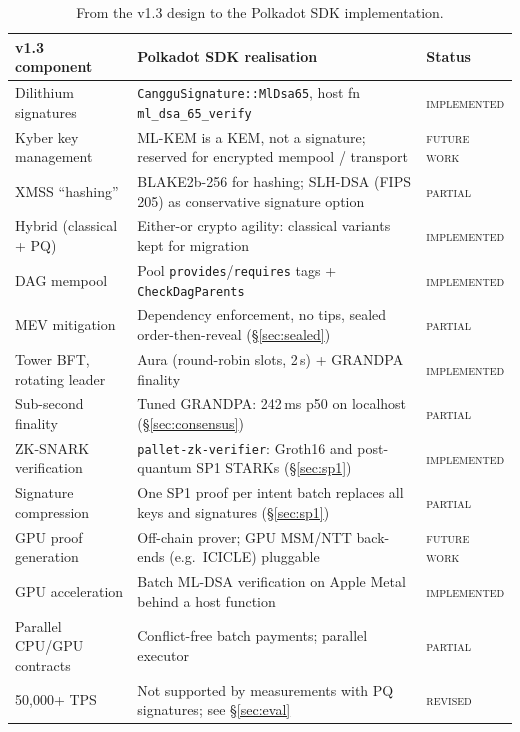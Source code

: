 \documentclass[11pt]{article}
\theoremstyle{definition}
\theoremstyle{remark}
\newcommand{\status}[1]{\textsc{#1}}
\newcommand{\impl}{\status{implemented}}
\newcommand{\partly}{\status{partial}}
\newcommand{\future}{\status{future work}}
\begin{document}
\begin{table}[ht]
\centering
\small
\begin{tabularx}{\textwidth}{@{}lXl@{}}
\toprule
\textbf{v1.3 component} & \textbf{Polkadot SDK realisation} & \textbf{Status} \\
\midrule
Dilithium signatures & \texttt{CangguSignature::MlDsa65}, host fn \texttt{ml\_dsa\_65\_verify} & \impl \\
Kyber key management & ML-KEM is a KEM, not a signature; reserved for encrypted mempool / transport & \future \\
XMSS ``hashing'' & BLAKE2b-256 for hashing; SLH-DSA (FIPS 205) as conservative signature option & \partly \\
Hybrid (classical + PQ) & Either-or crypto agility: classical variants kept for migration & \impl \\
DAG mempool & Pool \texttt{provides}/\texttt{requires} tags + \texttt{CheckDagParents} & \impl \\
MEV mitigation & Dependency enforcement, no tips, sealed order-then-reveal (\S\ref{sec:sealed}) & \partly \\
Tower BFT, rotating leader & Aura (round-robin slots, 2\,s) + GRANDPA finality & \impl \\
Sub-second finality & Tuned GRANDPA: 242\,ms p50 on localhost (\S\ref{sec:consensus}) & \partly \\
ZK-SNARK verification & \texttt{pallet-zk-verifier}: Groth16 and post-quantum SP1 STARKs (\S\ref{sec:sp1}) & \impl \\
Signature compression & One SP1 proof per intent batch replaces all keys and signatures (\S\ref{sec:sp1}) & \partly \\
GPU proof generation & Off-chain prover; GPU MSM/NTT back-ends (e.g.\ ICICLE) pluggable & \future \\
GPU acceleration & Batch ML-DSA verification on Apple Metal behind a host function & \impl \\
Parallel CPU/GPU contracts & Conflict-free batch payments; parallel executor & \partly \\
50{,}000+ TPS & Not supported by measurements with PQ signatures; see \S\ref{sec:eval} & \status{revised} \\
\bottomrule
\end{tabularx}
\caption{From the v1.3 design to the Polkadot SDK implementation.}
\label{tab:status}
\end{table}

\end{document}
